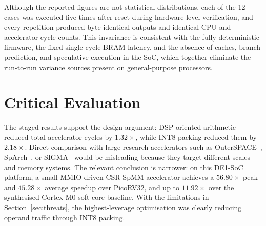 Although the reported figures are not statistical distributions, each
of the 12 cases was executed five times after reset during
hardware-level verification, and every repetition produced
byte-identical outputs and identical CPU and accelerator cycle counts.
This invariance is consistent with the fully deterministic firmware,
the fixed single-cycle BRAM latency, and the absence of caches, branch
prediction, and speculative execution in the SoC, which together
eliminate the run-to-run variance sources present on general-purpose
processors.

\section{Critical Evaluation}

The staged results support the design argument: DSP-oriented arithmetic
reduced total accelerator cycles by $1.32\times$, while INT8 packing
reduced them by $2.18\times$. Direct comparison with large research
accelerators such as OuterSPACE~\citep{outerspace2018},
SpArch~\citep{sparch2020}, or SIGMA~\citep{sigma2020} would be
misleading because they target different scales and memory systems. The
relevant conclusion is narrower: on this DE1-SoC platform, a small
MMIO-driven CSR SpMM accelerator achieves a $56.80\times$ peak and
$45.28\times$ average speedup over PicoRV32, and up to $11.92\times$
over the synthesised Cortex-M0 soft core baseline. With the limitations in
Section~\ref{sec:threats}, the highest-leverage optimisation was clearly
reducing operand traffic through INT8 packing.
